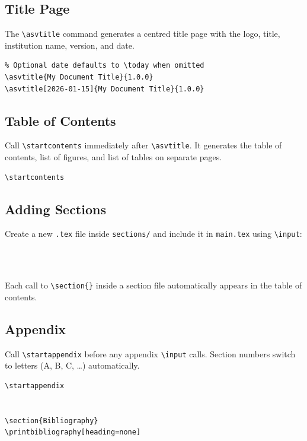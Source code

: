 \subsection{Title Page}

The \texttt{\textbackslash asvtitle} command generates a centred title page with the logo,
title, institution name, version, and date.

\begin{verbatim}
% Optional date defaults to \today when omitted
\asvtitle{My Document Title}{1.0.0}
\asvtitle[2026-01-15]{My Document Title}{1.0.0}
\end{verbatim}

\subsection{Table of Contents}

Call \texttt{\textbackslash startcontents} immediately after \texttt{\textbackslash asvtitle}.
It generates the table of contents, list of figures, and list of tables on separate pages.

\begin{verbatim}
\startcontents
\end{verbatim}

\subsection{Adding Sections}

Create a new \texttt{.tex} file inside \texttt{sections/} and include it in \texttt{main.tex}
using \texttt{\textbackslash input}:

\begin{verbatim}



\end{verbatim}

Each call to \texttt{\textbackslash section\{\}} inside a section file automatically appears in
the table of contents.

\subsection{Appendix}

Call \texttt{\textbackslash startappendix} before any appendix \texttt{\textbackslash input} calls.
Section numbers switch to letters (A, B, C, \ldots) automatically.

\begin{verbatim}
\startappendix


\section{Bibliography}
\printbibliography[heading=none]
\end{verbatim}

